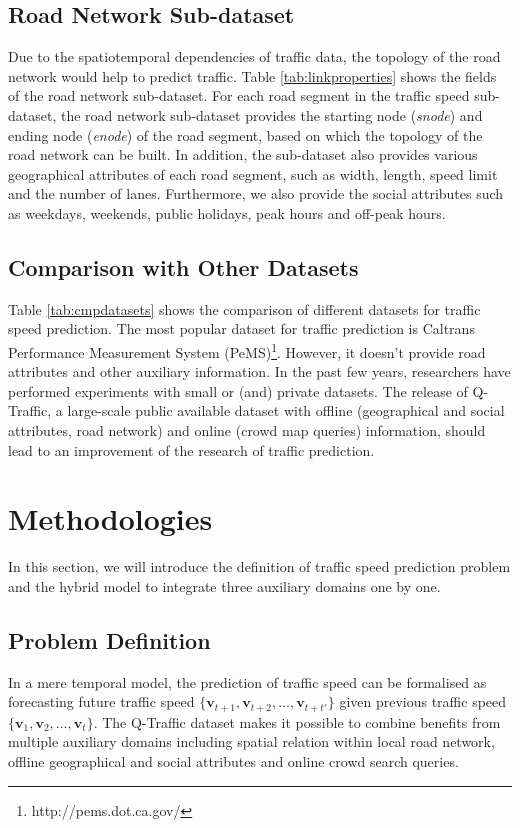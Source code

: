 \subsection{Road Network Sub-dataset}

Due to the spatiotemporal dependencies of traffic data, the topology of the road network would help to predict traffic. Table \ref{tab:linkproperties} shows the fields of the road network sub-dataset. For each road segment in the traffic speed sub-dataset, the road network sub-dataset provides the starting node (\textit{snode}) and ending node (\textit{enode}) of the road segment, based on which the topology of the road network can be built. In addition, the sub-dataset also provides various geographical attributes of each road segment, such as width, length, speed limit and the number of lanes. Furthermore, we also provide the social attributes such as weekdays, weekends, public holidays, peak hours and off-peak hours.

\subsection{Comparison with Other Datasets}

Table \ref{tab:cmpdatasets} shows the comparison of different datasets for traffic speed prediction. The most popular dataset for traffic prediction is Caltrans Performance Measurement System (PeMS)\footnote{http://pems.dot.ca.gov/}. However, it doesn't provide road attributes and other auxiliary information. In the past few years, researchers have performed experiments with small or (and) private datasets. The release of Q-Traffic, a large-scale public available dataset with offline (geographical and social attributes, road network) and online (crowd map queries) information, should lead to an improvement of the research of traffic prediction.


\section{Methodologies}
\label{methods}
In this section, we will introduce the definition of traffic speed prediction problem and the hybrid model to integrate three auxiliary domains one by one.

\subsection{Problem Definition}
In a mere temporal model, the prediction of traffic speed can be formalised as forecasting future traffic speed $\{\bm{v}_{t+1}, \bm{v}_{t+2}, \dots, \bm{v}_{t+t'}\}$ given previous traffic speed $\{\bm{v}_1, \bm{v}_2, \dots, \bm{v}_t\}$. The Q-Traffic dataset makes it possible to combine benefits from multiple auxiliary domains including spatial relation within local road network, offline geographical and social attributes and online crowd search queries. 

